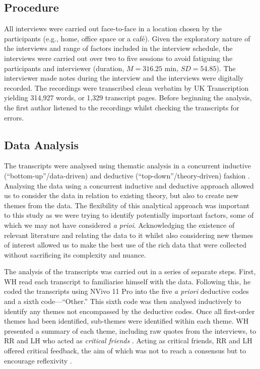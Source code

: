 \documentclass[
  12pt,
  a4paper,
]{book}
\begin{document}
\hypertarget{procedure}{%
\subsection{Procedure}\label{procedure}}

All interviews were carried out face-to-face in a location chosen by the participants (e.g., home, office space or a café). Given the exploratory nature of the interviews and range of factors included in the interview schedule, the interviews were carried out over two to five sessions to avoid fatiguing the participants and interviewer (duration, \(M = 316.25\) min, \(SD = 54.85\)). The interviewer made notes during the interview and the interviews were digitally recorded. The recordings were transcribed clean verbatim by UK Transcription yielding 314,927 words, or 1,329 transcript pages. Before beginning the analysis, the first author listened to the recordings whilst checking the transcripts for errors.

\hypertarget{data-analysis}{%
\subsection{Data Analysis}\label{data-analysis}}

The transcripts were analysed using thematic analysis in a concurrent inductive (``bottom-up''/data-driven) and deductive (``top-down''/theory-driven) fashion \citep{Braun2006}. Analysing the data using a concurrent inductive and deductive approach allowed us to consider the data in relation to existing theory, but also to create new themes from the data. The flexibility of this analytical approach was important to this study as we were trying to identify potentially important factors, some of which we may not have considered \emph{a prioi}. Acknowledging the existence of relevant literature and relating the data to it whilst also considering new themes of interest allowed us to make the best use of the rich data that were collected without sacrificing its complexity and nuance.

The analysis of the transcripts was carried out in a series of separate steps. First, WH read each transcript to familiarise himself with the data. Following this, he coded the transcripts using NVivo 11 Pro \citep{QSR2017} into the five \emph{a priori} deductive codes and a sixth code---``Other.'' This sixth code was then analysed inductively to identify any themes not encompassed by the deductive codes. Once all first-order themes had been identified, sub-themes were identified within each theme. WH presented a summary of each theme, including raw quotes from the interviews, to RR and LH who acted as \emph{critical friends} \citep[cf.~][]{Sparkes2014, Smith2018a}. Acting as critical friends, RR and LH offered critical feedback, the aim of which was not to reach a consensus but to encourage reflexivity \citep{Smith2018a}.
\end{document}
